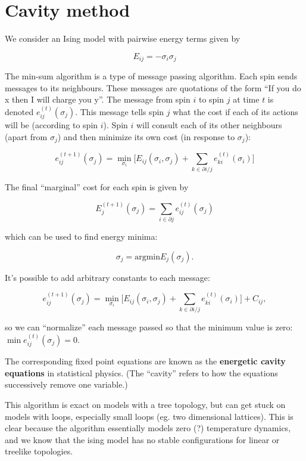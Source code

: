 \documentclass[11pt]{article}
\begin{document}

%
%

\section{Cavity method}


We consider an Ising model with pairwise energy terms given by

$$
    E_{ij} = -\sigma_i\sigma_j
$$

The min-sum algorithm is a type of message passing algorithm.
Each spin sends messages to its neighbours.
These messages are quotations of the form 
``If you do x then I will charge you y''.
The message from spin $i$ to spin $j$ at time $t$ is denoted
$e_{ij}^{(t)}(\sigma_j)$.
This message tells spin $j$ what the cost if each of
its actions will be (according to spin $i$).
Spin $i$ will consult each of its other neighbours 
(apart from $\sigma_j$) and then minimize its own cost
(in response to $\sigma_j$):

$$
e_{ij}^{(t+1)}(\sigma_j) = \min_{\sigma_i}\bigl[ E_{ij}(\sigma_i, \sigma_j)
  + \sum_{k\in \partial i/j} e_{ki}^{(t)}(\sigma_i) \bigr]
$$

The final ``marginal'' cost for each spin is given by

$$
    E_j^{(t+1)}(\sigma_j) = \sum_{i\in \partial j} e_{ij}^{(t)}(\sigma_j)
$$

which can be used to find energy minima:

$$
    \sigma_j = \text{argmin} E_j(\sigma_j).
$$

It's possible to add arbitrary constants to each
message:

$$
e_{ij}^{(t+1)}(\sigma_j) = \min_{\sigma_i}\bigl[ E_{ij}(\sigma_i, \sigma_j)
  + \sum_{k\in \partial i/j} e_{ki}^{(t)}(\sigma_i) \bigr] + C_{ij},
$$

so we can ``normalize'' each message passed so
that the minimum value is zero: $\min e_{ij}^{(t)}(\sigma_j) = 0.$

The corresponding fixed point equations are known
as the {\bf energetic cavity equations} in statistical physics.
(The ``cavity'' refers to how the equations successively
remove one variable.)

This algorithm is exact on models with a tree topology,
but can get stuck on models with loops, especially small
loops (eg. two dimensional lattices). This is clear
because the algorithm essentially models zero (?) temperature
dynamics, and we know that the ising model has no
stable configurations for linear or treelike topologies.
\end{document}
